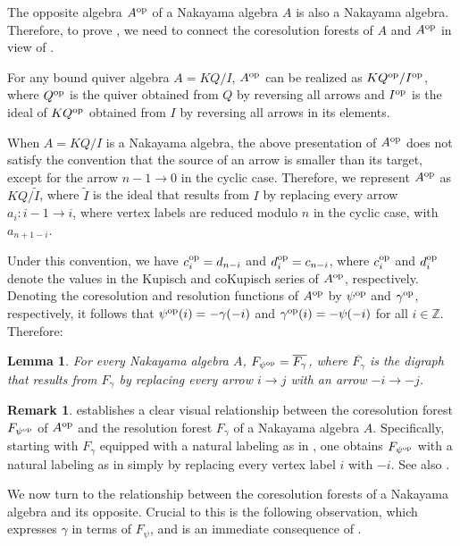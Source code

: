 \documentclass[a4paper]{amsart}
\newtheorem{lemma}[theorem]{Lemma}
\theoremstyle{definition}
\newtheorem{remark}[theorem]{Remark}
\theoremstyle{remark}
\numberwithin{equation}{theorem}
\newcommand{\Z}{\mathbb{Z}}
\newcommand{\psiforest}{F_\psi}
\newcommand{\gammaforest}{F_\gamma}
\newcommand{\op}{\textnormal{op}}
\newcommand{\psiop}{\psi^{\op}}
\newcommand{\psiopforest}{F_{\psiop}}
\newcommand{\K}{K}
\begin{document}
The opposite algebra $A^\op$ of a Nakayama algebra $A$ is also a Nakayama algebra.  Therefore, to prove , we need to connect the coresolution forests 
of $A$ and $A^\op$ in view of .

For any bound quiver algebra $ A = \K Q / I $, $ A^\op $ can be realized as $ \K Q^\op / I^\op $, where $ Q^\op $ is the quiver obtained from $ Q $ by reversing all arrows and $ I^\op $ is the ideal of $ \K Q^\op $ obtained from $ I $ by reversing all arrows in its elements.


When $ A = \K Q / I $ is a Nakayama algebra, the above presentation of $ A^\op $ does not satisfy the convention that the source of an arrow is smaller than its target, except for the arrow $ n-1 \to 0 $ in the cyclic case. Therefore, we represent $ A^\op $ as $ \K Q / \tilde{I} $, where $ \tilde{I} $ is the ideal that results from $ I $ by replacing every arrow $ a_i \colon i-1 \to i $, where vertex labels are reduced modulo $ n $ in the cyclic case, with $ a_{n+1-i}$.

Under this convention, we have $ c^\op_i = d_{n-i} $ and $ d^\op_i = c_{n-i} $, where $ c^\op_i $ and $ d^\op_i $ denote the values in the Kupisch and coKupisch series of $ A^\op $, respectively. Denoting the coresolution and resolution functions of $ A^\op $ by $ \psi^\op $ and $ \gamma^\op $, respectively, it follows that $ \psi^\op(i)= -\gamma(-i) $ and $ \gamma^\op(i) = -\psi(-i) $ for all $ i \in \Z $.
Therefore:
\begin{lemma}\label{lemma:res:forest}
    For every Nakayama algebra $A$, $ \psiopforest = \overline{\gammaforest} $, where $ \overline{\gammaforest} $ is the digraph that results from $ \gammaforest $ by replacing every arrow $ i \to j $ with an arrow $ -i \to -j $.
\end{lemma}

\begin{remark}\label{minus.forest}
 establishes a clear visual relationship between the coresolution forest $\psiopforest$ of $A^\op$ and the resolution forest $\gammaforest$ of a Nakayama algebra $A$. Specifically, starting with $\gammaforest$ equipped with a natural labeling as in , one obtains $\psiopforest$ with a natural labeling as in  simply by replacing every vertex label $i$ with $-i$. See also .
\end{remark}

We now turn to the relationship between the coresolution forests of a Nakayama algebra and its opposite. Crucial to this is the following observation, which expresses $ \gamma $ in terms of $ \psiforest $, and is an immediate consequence of .
\end{document}
